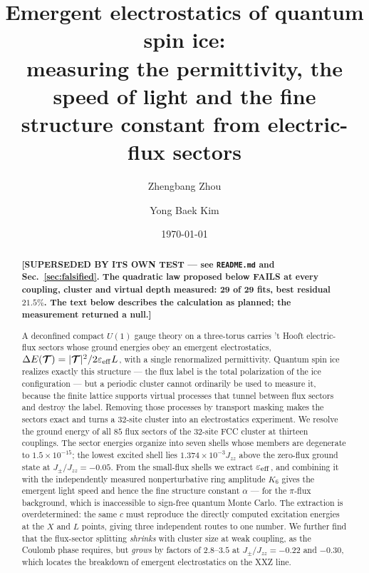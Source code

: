 \documentclass[aps,prb,preprint,amsmath,amssymb,superscriptaddress,
longbibliography,floatfix]{revtex4-2}
\newcommand{\Jzz}{J_{zz}}
\newcommand{\Jpm}{J_{\pm}}
\DeclareRobustCommand{\bT}{\bm{\mathcal T}}
\begin{document}
\title{Emergent electrostatics of quantum spin ice:\\
measuring the permittivity, the speed of light and the fine structure
constant from electric-flux sectors}

\author{Zhengbang Zhou}

\author{Yong Baek Kim}

\date{\today}

\begin{abstract}
\textbf{\color{red}[SUPERSEDED BY ITS OWN TEST --- see \texttt{README.md} and
Sec.~\ref{sec:falsified}.  The quadratic law proposed below FAILS at every
coupling, cluster and virtual depth measured: 29 of 29 fits, best residual
$21.5\%$.  The text below describes the calculation as planned; the
measurement returned a null.]}

A deconfined compact $U(1)$ gauge theory on a three-torus carries 't Hooft
electric-flux sectors whose ground energies obey an emergent electrostatics,
$\Delta E(\bT)=|\bT|^2/2\varepsilon_{\rm eff}L$, with a single renormalized
permittivity.  Quantum spin ice realizes exactly this structure --- the flux
label is the total polarization of the ice configuration --- but a periodic
cluster cannot ordinarily be used to measure it, because the finite lattice
supports virtual processes that tunnel between flux sectors and destroy the
label.  Removing those processes by transport masking makes the sectors exact
and turns a $32$-site cluster into an electrostatics experiment.  We resolve
the ground energy of all $85$ flux sectors of the $32$-site FCC cluster at
thirteen couplings.  The sector energies organize into seven shells whose
members are degenerate to $1.5\times10^{-15}$; the lowest excited shell lies
$1.374\times10^{-3}\Jzz$ above the zero-flux ground state at
$\Jpm/\Jzz=-0.05$.  From the small-flux shells we extract
$\varepsilon_{\rm eff}$, and combining it with the independently measured
nonperturbative ring amplitude $K_6$ gives the emergent light speed and hence
the fine structure constant $\alpha$ --- for the $\pi$-flux background, which
is inaccessible to sign-free quantum Monte Carlo.  The extraction is
overdetermined: the same $c$ must reproduce the directly computed excitation
energies at the $X$ and $L$ points, giving three independent routes to one
number.  We further find that the flux-sector splitting \emph{shrinks} with
cluster size at weak coupling, as the Coulomb phase requires, but \emph{grows}
by factors of $2.8$--$3.5$ at $\Jpm/\Jzz=-0.22$ and $-0.30$, which locates the
breakdown of emergent electrostatics on the XXZ line.
\end{abstract}
\end{document}
